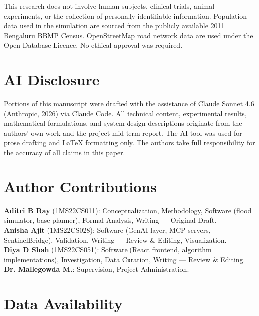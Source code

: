 \documentclass[journal]{IEEEtran}
\begin{document}
This research does not involve human subjects, clinical trials, animal experiments, or the
collection of personally identifiable information. Population data used in the simulation
are sourced from the publicly available 2011 Bengaluru BBMP Census. OpenStreetMap road
network data are used under the Open Database Licence. No ethical approval was required.

\section*{AI Disclosure}

Portions of this manuscript were drafted with the assistance of Claude Sonnet 4.6
(Anthropic, 2026) via Claude Code. All technical content, experimental results, mathematical
formulations, and system design descriptions originate from the authors' own work and the
project mid-term report. The AI tool was used for prose drafting and LaTeX formatting only.
The authors take full responsibility for the accuracy of all claims in this paper.

\section*{Author Contributions}

\textbf{Aditri B Ray} (1MS22CS011): Conceptualization, Methodology, Software (flood
simulator, base planner), Formal Analysis, Writing — Original Draft.\\
\textbf{Anisha Ajit} (1MS22CS028): Software (GenAI layer, MCP servers, SentinelBridge),
Validation, Writing — Review \& Editing, Visualization.\\
\textbf{Diya D Shah} (1MS22CS051): Software (React frontend, algorithm implementations),
Investigation, Data Curation, Writing — Review \& Editing.\\
\textbf{Dr. Mallegowda M.}: Supervision, Project Administration.

\section*{Data Availability}
\end{document}
